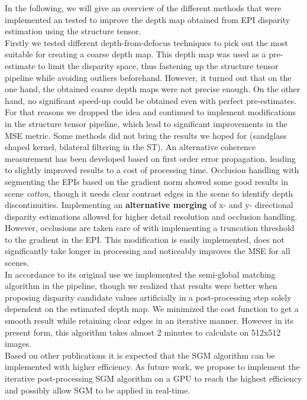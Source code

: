 \documentclass  [
  paper    = a4,
  BCOR     = 10mm,
  twoside,
  fontsize = 12pt,
  fleqn,
  toc      = bibnumbered,
  toc      = listofnumbered,
  numbers  = noendperiod,
  headings = normal,
  listof   = leveldown,
  version  = 3.03
]                                       {scrreprt}
\begin{document}
In the following, we will give an overview of the different methods that were implemented an tested to improve the depth map obtained from EPI disparity estimation using the structure tensor.\\
Firstly we tested different depth-from-defocus techniques to pick out the most suitable for creating a coarse depth map. This depth map was used as a pre-estimate to limit the disparity space, thus fastening up the structure tensor pipeline while avoiding outliers beforehand. However, it turned out that on the one hand, the obtained coarse depth maps were not precise enough. On the other hand, no significant speed-up could be obtained even with perfect pre-estimates. For that reasons we dropped the idea and continued to implement modifications in the structure tensor pipeline, which lead to significant improvements in the MSE metric. Some methods did not bring the results we hoped for (sandglass shaped kernel, bilateral filtering in the ST).
An alternative coherence measurement has been developed based on first order error propagation, leading to slightly improved results to a cost of processing time. Occlusion handling with segmenting the EPIs based on the gradient norm showed some good results in scene \textit{cotton}, though it needs clear contrast edges in the scene to identify depth discontinuities. Implementing an \textbf{alternative merging} of x- and y- directional disparity estimations allowed for higher detail resolution and occlusion handling. However, occlusions are taken care of with implementing a truncation threshold to the gradient in the EPI. This modification is easily implemented, does not significantly take longer in processing and noticeably improves the MSE for all scenes. \\
In accordance to its original use we implemented the semi-global matching algorithm in the pipeline, though we realized that results were better when proposing disparity candidate values artificially in a post-processing step solely dependent on the estimated depth map. We minimized the cost function to get a smooth result while retaining clear edges in an iterative manner. However in its present form, this algorithm takes almost 2 minutes to calculate on 512x512 images.
\\
Based on other publications it is expected that the SGM algorithm can be implemented with higher efficiency. As future work, we propose to implement the iterative post-processing SGM algorithm on a GPU to reach the highest efficiency and possibly allow SGM to be applied in real-time.\\
\end{document}
